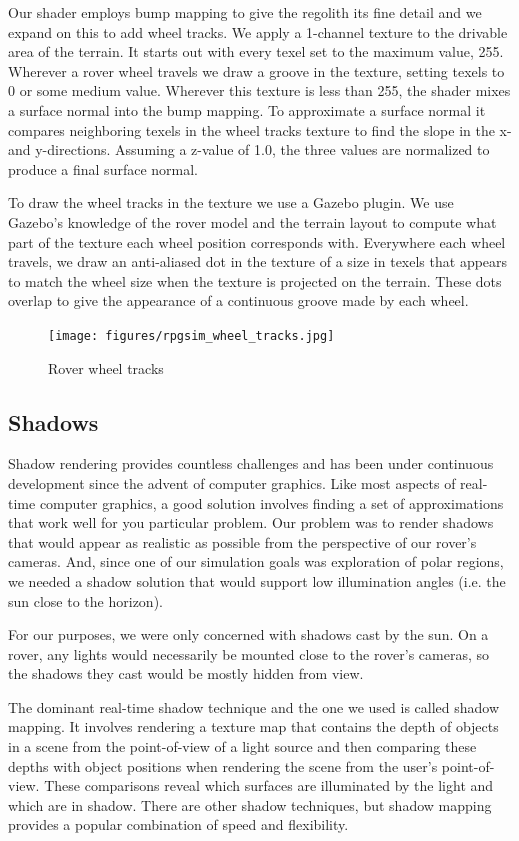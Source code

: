 \documentclass[twocolumn,letterpaper]{IEEEAerospaceCLS}  %
\begin{document}
Our shader employs bump mapping to give the regolith its fine detail and we expand on this to add wheel tracks. 
We apply a 1-channel texture to the drivable area of the terrain.
It starts out with every texel set to the maximum value, 255. 
Wherever a rover wheel travels we draw a groove in the texture, setting texels to 0 or some medium value.
Wherever this texture is less than 255, the shader mixes a surface normal into the bump mapping. 
To approximate a surface normal it compares neighboring texels in the wheel tracks texture to find the slope in the x- and y-directions. 
Assuming a z-value of 1.0, the three values are normalized to produce a final surface normal.

To draw the wheel tracks in the texture we use a Gazebo plugin. 
We use Gazebo's knowledge of the rover model and the terrain layout to compute what part of the texture each wheel position corresponds with. 
Everywhere each wheel travels, we draw an anti-aliased dot in the texture of a size in texels that appears to match the wheel size when the texture is projected on the terrain. 
These dots overlap to give the appearance of a continuous groove made by each wheel.
\begin{figure}[h!]
  \texttt{[image: figures/rpgsim\_wheel\_tracks.jpg]}
  \caption{Rover wheel tracks}
  \label{fig:wheeltracks}
\end{figure}

\subsection{Shadows}
Shadow rendering provides countless challenges and has been under continuous development since the advent of computer graphics. 
Like most aspects of real-time computer graphics, a good solution involves finding a set of approximations that work well for you particular problem. 
Our problem was to render shadows that would appear as realistic as possible from the perspective of our rover's cameras. 
And, since one of our simulation goals was exploration of polar regions, we needed a shadow solution that would support low illumination angles (i.e. the sun close to the horizon).

For our purposes, we were only concerned with shadows cast by the sun. 
On a rover, any lights would necessarily be mounted close to the rover's cameras, so the shadows they cast would be mostly hidden from view.

The dominant real-time shadow technique and the one we used is called shadow mapping. 
It involves rendering a texture map that contains the depth of objects in a scene from the point-of-view of a light source and then comparing these depths with object positions when rendering the scene from the user's point-of-view. 
These comparisons reveal which surfaces are illuminated by the light and which are in shadow. 
There are other shadow techniques, but shadow mapping provides a popular combination of speed and flexibility.
\end{document}
